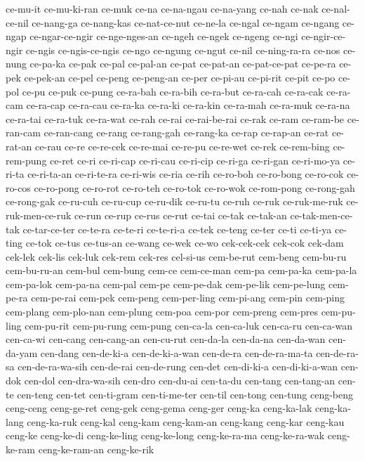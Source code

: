 {ce-mu-it ce-mu-ki-ran ce-muk ce-na ce-na-ngau ce-na-yang ce-nah ce-nak
ce-nal-ce-nil ce-nang-ga ce-nang-kas ce-nat-ce-nut ce-ne-la ce-ngal
ce-ngam ce-ngang ce-ngap ce-ngar-ce-ngir ce-nge-nges-an ce-ngeh ce-ngek
ce-ngeng ce-ngi ce-ngir-ce-ngir ce-ngis ce-ngis-ce-ngis ce-ngo ce-ngung
ce-ngut ce-nil ce-ning-ra-ra ce-nos ce-nung ce-pa-ka ce-pak ce-pal
ce-pal-an ce-pat ce-pat-an ce-pat-ce-pat ce-pe-ra ce-pek ce-pek-an ce-pel
ce-peng ce-peng-an ce-per ce-pi-au ce-pi-rit ce-pit ce-po ce-pol ce-pu
ce-puk ce-pung ce-ra-bah ce-ra-bih ce-ra-but ce-ra-cah ce-ra-cak ce-ra-cam
ce-ra-cap ce-ra-cau ce-ra-ka ce-ra-ki ce-ra-kin ce-ra-mah ce-ra-muk
ce-ra-na ce-ra-tai ce-ra-tuk ce-ra-wat ce-rah ce-rai ce-rai-be-rai ce-rak
ce-ram ce-ram-be ce-ran-cam ce-ran-cang ce-rang ce-rang-gah ce-rang-ka
ce-rap ce-rap-an ce-rat ce-rat-an ce-rau ce-re ce-re-cek ce-re-mai
ce-re-pu ce-re-wet ce-rek ce-rem-bing ce-rem-pung ce-ret ce-ri ce-ri-cap
ce-ri-cau ce-ri-cip ce-ri-ga ce-ri-gan ce-ri-mo-ya ce-ri-ta ce-ri-ta-an
ce-ri-te-ra ce-ri-wis ce-ria ce-rih ce-ro-boh ce-ro-bong ce-ro-cok
ce-ro-cos ce-ro-pong ce-ro-rot ce-ro-teh ce-ro-tok ce-ro-wok ce-rom-pong
ce-rong-gah ce-rong-gak ce-ru-cuh ce-ru-cup ce-ru-dik ce-ru-tu ce-ruh
ce-ruk ce-ruk-me-ruk ce-ruk-men-ce-ruk ce-run ce-rup ce-rus ce-rut ce-tai
ce-tak ce-tak-an ce-tak-men-ce-tak ce-tar-ce-ter ce-te-ra ce-te-ri
ce-te-ri-a ce-tek ce-teng ce-ter ce-ti ce-ti-ya ce-ting ce-tok ce-tus
ce-tus-an ce-wang ce-wek ce-wo cek-cek-cek cek-cok cek-dam cek-lek cek-lis
cek-luk cek-rem cek-res cel-si-us cem-be-rut cem-beng cem-bu-ru
cem-bu-ru-an cem-bul cem-bung cem-ce cem-ce-man cem-pa cem-pa-ka cem-pa-la
cem-pa-lok cem-pa-na cem-pal cem-pe cem-pe-dak cem-pe-lik cem-pe-lung
cem-pe-ra cem-pe-rai cem-pek cem-peng cem-per-ling cem-pi-ang cem-pin
cem-ping cem-plang cem-plo-nan cem-plung cem-poa cem-por cem-preng
cem-pres cem-pu-ling cem-pu-rit cem-pu-rung cem-pung cen-ca-la cen-ca-luk
cen-ca-ru cen-ca-wan cen-ca-wi cen-cang cen-cang-an cen-cu-rut cen-da-la
cen-da-na cen-da-wan cen-da-yam cen-dang cen-de-ki-a cen-de-ki-a-wan
cen-de-ra cen-de-ra-ma-ta cen-de-ra-sa cen-de-ra-wa-sih cen-de-rai
cen-de-rung cen-det cen-di-ki-a cen-di-ki-a-wan cen-dok cen-dol
cen-dra-wa-sih cen-dro cen-du-ai cen-ta-du cen-tang cen-tang-an cen-te
cen-teng cen-tet cen-ti-gram cen-ti-me-ter cen-til cen-tong cen-tung
ceng-beng ceng-ceng ceng-ge-ret ceng-gek ceng-gema ceng-ger ceng-ka
ceng-ka-lak ceng-ka-lang ceng-ka-ruk ceng-kal ceng-kam ceng-kam-an
ceng-kang ceng-kar ceng-kau ceng-ke ceng-ke-di ceng-ke-ling ceng-ke-long
ceng-ke-ra-ma ceng-ke-ra-wak ceng-ke-ram ceng-ke-ram-an ceng-ke-rik
}
